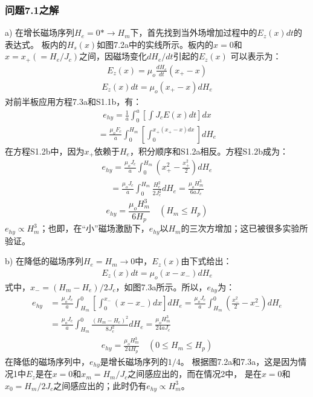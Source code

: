 \subsubsection{问题7.1之解}
a) 在增长磁场序列$H_e=0*\rightarrow H_m$下，首先找到当外场增加过程中的$E_z(x)dt$的表达式。
板内的$H_s(x)$如图7.2a中的实线所示。板内的$x=0$和$x=x_+(=H_e/J_c)$之间，因磁场变化$dH_e/dt$引起的$E_z(x)$
可以表示为：
\begin{align*}%
E_z(x)=\mu_o\frac{dH_e}{dt}(x_+-x) \tag{S1.1a}
\end{align*}
\begin{align*}%
E_z(x)dt=\mu_o(x_+-x)dH_e \tag{S1.1b}
\end{align*}
对前半板应用方程7.3a和S1.1b，有：
\begin{align*}%
e_{hy}=\frac{1}{a}\int_{0}^{a}\left[\int J_cE(x)dt\right]dx \tag{S1.2a}
\end{align*}
\begin{align*}
=\frac{\mu_oF_c}{a}\int_{0}^{H_m}\left[\int_{0}^{x_+(x_+-x)dx}\right]dH_e \tag{S1.2b}
\end{align*}
在方程S1.2b中，因为$x_+$依赖于$H_e$，积分顺序和S1.2a相反。方程S1.2b成为：
\begin{align*}%
e_{hy}=\frac{\mu_oJ_c}{a}\int_{0}^{H_m}\left(x_{+}^{2}-\frac{x_{+}^{2}}{2}\right)dH_e  \tag{S1.2c}
\end{align*}
\begin{align*}
=\frac{\mu_oJ_c}{a}\int_{0}^{H_m}\frac{H_{e}^{2}}{2J_{c}^{2}}dH_e=\frac{\mu_oH_{m}^{3}}{6aJ_c} \tag{S1.2d}
\end{align*}
\begin{equation}%
e_{hy}=\frac{\mu_oH_{m}^{3}}{6H_p} \quad   (H_m\leq H_p) \tag{7.13a}
\end{equation}
$e_{hy}\propto H_m^3$；也即，在“小”磁场激励下，$e_{hy}$以$H_m$的三次方增加；这已被很多实验所验证。

b) 在降低的磁场序列$H_e=H_m\rightarrow 0$中，$E_z(x)$由下式给出：
\begin{align*}%
E_z(x)dt=\mu_o(x-x_-)dH_e \tag{S1.3}
\end{align*}
式中，$x_-=(H_m-H_e)/2J_c$，如图7.3a所示。所以，$e_{hy}$为：
\begin{align*}%
e_{hy}&=\frac{\mu_oJ_c}{a}\int_{H_m}^{0}\left[\int_{0}^{x_-}(x-x_-)dx\right]dH_e=\frac{\mu_oJ_c}{a}\int_{H_m}^{0}\left(\frac{x_{-}^{2}}{2}-x_{-}^{2}\right)dH_e \\\tag{S1.4}
&=\frac{\mu_oJ_c}{a}\int_{H_m}^{0}\frac{(H_m-H_e)^2}{8J_{c}^{2}}dH_e=\frac{\mu_oH_{m}^{3}}{24aJ_c}
\end{align*}
\begin{align*}%
e_{hy}=\frac{\mu_oH_{m}^{3}}{24H_p}  \quad     (0\leq H_m\leq H_p) \tag{7.14a}
\end{align*}
在降低的磁场序列中，$e_{hy}$是增长磁场序列的$1/4$。
根据图7.2a和7.3a，这是因为情况1中$E_z$是在$x=0$和$x_m=H_m/J_c$之间感应出的，而在情况2中，
是在$x=0$和$x_0=H_m/2J_c$之间感应出的；此时仍有$e_{hy}\propto H_m^3$。

